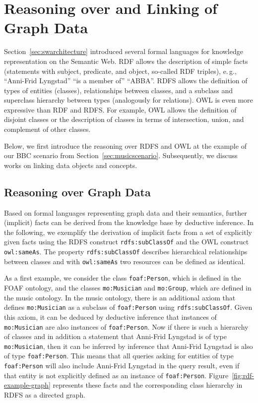 \documentclass[a4paper,USenglish]{tgdk-v2021}
\begin{document}
\section{Reasoning over and Linking of Graph Data}
\label{sec:reasoning}

Section~\ref{sec:swarchitecture} introduced several formal languages for knowledge representation on the Semantic Web.
RDF allows the description of simple facts (statements with subject, predicate, and object, so-called RDF triples), e.\,g., ``Anni-Frid Lyngstad'' ``is a member of'' ``ABBA''.
RDFS allows the definition of types of entities (classes), relationships between classes, and a subclass and superclass hierarchy between types (analogously for relations).
OWL is even more expressive than RDF and RDFS.
For example, OWL allows the definition of disjoint classes or the description of classes in terms of intersection, union, and complement of other classes.

Below, we first introduce the reasoning over RDFS and OWL at the example of our BBC scenario from Section~\ref{sec:musicscenario}.
Subsequently, we discuss works on linking data objects and concepts.

\subsection{Reasoning over Graph Data}

Based on formal languages representing graph data and their semantics, further (implicit) facts can be derived from the knowledge base by deductive inference.
In the following, we exemplify the derivation of implicit facts from a set of explicitly given facts using the RDFS construct \texttt{rdfs:subClassOf} and the OWL construct \texttt{owl:sameAs}.
The property \texttt{rdfs:subClassOf} describes hierarchical relationships between classes and with \texttt{owl:sameAs} two resources can be defined as identical.

As a first example, we consider the class \texttt{foaf:Person}, which is defined in the FOAF ontology, and the classes \texttt{mo:Musician} and \texttt{mo:Group}, which are defined in the music ontology.
In the music ontology, there is an additional axiom that defines \texttt{mo:Musician} as a subclass of \texttt{foaf:Person} using \texttt{rdfs:subClassOf}.
Given this axiom, it can be deduced by deductive inference that instances of \texttt{mo:Musician} are also instances of \texttt{foaf:Person}.
Now if there is such a hierarchy of classes and in addition a statement that Anni-Frid Lyngstad is of type \texttt{mo:Musician}, then it can be inferred by inference that Anni-Frid Lyngstad is also of type \texttt{foaf:Person}.
This means that all queries asking for entities of type \texttt{foaf:Person} will also include Anni-Frid Lyngstad in the query result, even if that entity is not explicitly defined as an instance of \texttt{foaf:Person}.
Figure~\ref{fig:rdf-example-graph} represents these facts and the corresponding class hierarchy in RDFS as a directed graph.
\end{document}
